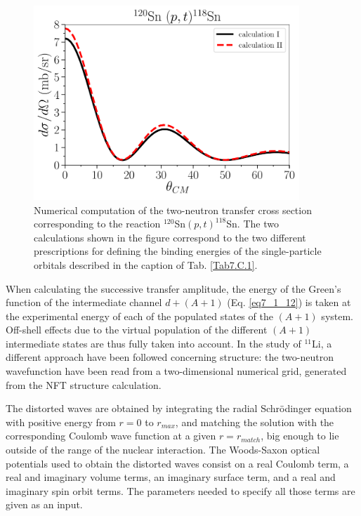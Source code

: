 \begin{subappendices}
\begin{table}
\end{table}
        \begin{figure}
	\centerline{\includegraphics*[width=10cm,angle=0]{C8/figsC8/120Sn_pt}}
	\caption{Numerical computation of the two-neutron transfer cross section corresponding to the reaction $^{120}$Sn$(p,t)^{118}$Sn. The two calculations shown in the figure correspond to the two different prescriptions for defining the binding energies of the single-particle orbitals described in the  caption of Tab. \ref{Tab7.C.1}.}\label{fig7.C.1}
\end{figure}
 When calculating the successive transfer amplitude, the energy of the Green's function of the intermediate channel $d+ (A+1)$ (Eq. \ref{eq7_1_12}) is taken at the experimental energy of each of the populated states of the $(A+1)$ system. Off-shell effects due to the virtual population of the different $(A+1)$ intermediate states are thus fully taken into account. In the study of $^{11}$Li, a different approach have been followed concerning  structure:  the  two-neutron wavefunction have been read from a two-dimensional numerical grid, generated from the  NFT structure calculation.
 
 
The distorted waves are obtained by integrating the radial Schr\"odinger equation with positive energy from $r=0$ to $r_{max}$, and matching the solution with the corresponding Coulomb wave function at a given $r=r_{match}$, big enough to lie outside of the range of the nuclear interaction. The  Woods-Saxon optical potentials  used to obtain the distorted waves consist on a real Coulomb term, a real and imaginary volume terms, an imaginary surface term, and a real and imaginary spin orbit terms. The parameters needed to specify all those terms are given as an input.  




\end{subappendices}
